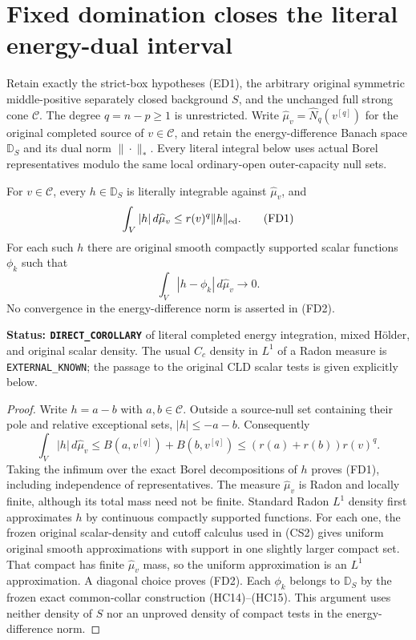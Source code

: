 \section{Fixed domination closes the literal energy-dual interval}
\label{sec:r12-fixed-domination-literal-closure}

Retain exactly the strict-box hypotheses \textup{(ED1)}, the
arbitrary original symmetric middle-positive separately closed
background $S$, and the unchanged full strong cone $\mathscr C$.
The degree $q=n-p\geq1$ is unrestricted. Write
$\widehat\mu_v=\widehat N_q(v^{[q]})$ for the original completed
source of $v\in\mathscr C$, and retain the energy-difference
Banach space $\mathbb D_S$ and its dual norm $\|\cdot\|_*$.
Every literal integral below uses actual Borel representatives
modulo the same local ordinary-open outer-capacity null sets.

\begin{lemma}
\label{lem:r12-fixed-source-L1-density}
For $v\in\mathscr C$, every $h\in\mathbb D_S$ is literally
integrable against $\widehat\mu_v$, and
\[
 \int_V |h|\,d\widehat\mu_v
       \leq r(v)^q\|h\|_{\rm ed}.
 \tag{FD1}
\]
For each such $h$ there are original smooth compactly supported
scalar functions $\phi_k$ such that
\[
       \int_V|h-\phi_k|\,d\widehat\mu_v\longrightarrow0.
 \tag{FD2}
\]
No convergence in the energy-difference norm is asserted in
\textup{(FD2)}.
\end{lemma}

\noindent\textbf{Status: \texttt{DIRECT\_COROLLARY}} of literal
completed energy integration, mixed H\"older, and original
scalar density. The usual $C_c$ density in $L^1$ of a Radon
measure is \texttt{EXTERNAL\_KNOWN}; the passage to the original
CLD scalar tests is given explicitly below.

\begin{proof}
Write $h=a-b$ with $a,b\in\mathscr C$. Outside a source-null
set containing their pole and relative exceptional sets,
$|h|\leq-a-b$. Consequently
\[
 \int_V|h|\,d\widehat\mu_v
 \leq B(a,v^{[q]})+B(b,v^{[q]})
 \leq(r(a)+r(b))r(v)^q.
\]
Taking the infimum over the exact Borel decompositions of $h$
proves \textup{(FD1)}, including independence of representatives.
The measure $\widehat\mu_v$ is Radon and locally finite, although
its total mass need not be finite. Standard Radon $L^1$ density
first approximates $h$ by continuous compactly supported functions.
For each one, the frozen original scalar-density and cutoff
calculus used in \textup{(CS2)} gives uniform original smooth
approximations with support in one slightly larger compact set.
That compact has finite $\widehat\mu_v$ mass, so the uniform
approximation is an $L^1$ approximation. A diagonal choice proves
\textup{(FD2)}. Each $\phi_k$ belongs to $\mathbb D_S$ by the
frozen exact common-collar construction \textup{(HC14)--(HC15)}.
This argument uses neither density of $S$ nor an unproved density
of compact tests in the energy-difference norm.
\end{proof}

